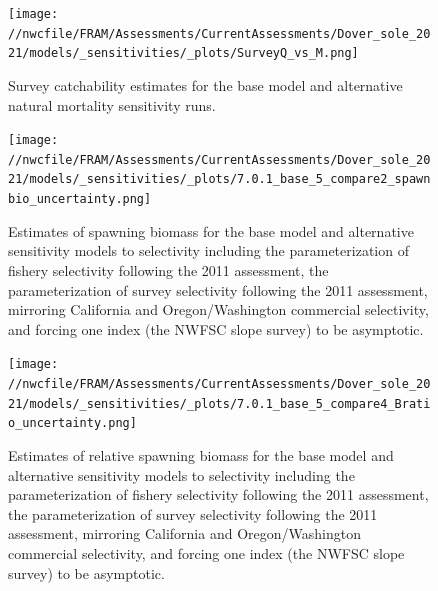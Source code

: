 \documentclass[11pt,
  english,
  a4paper,
]{article}
\begin{document}
\begin{figure}
\centering
\texttt{[image: //nwcfile/FRAM/Assessments/CurrentAssessments/Dover\_sole\_2021/models/\_sensitivities/\_plots/SurveyQ\_vs\_M.png]}
\caption{Survey catchability estimates for the base model and alternative natural mortality sensitivity runs.\label{fig:sens-m-survQ}}
\end{figure}

\tagmcend\tagstructend


\begin{figure}
\centering
\texttt{[image: //nwcfile/FRAM/Assessments/CurrentAssessments/Dover\_sole\_2021/models/\_sensitivities/\_plots/7.0.1\_base\_5\_compare2\_spawnbio\_uncertainty.png]}
\caption{Estimates of spawning biomass for the base model and alternative sensitivity models to selectivity including the parameterization of fishery selectivity following the 2011 assessment, the parameterization of survey selectivity following the 2011 assessment, mirroring California and Oregon/Washington commercial selectivity, and forcing one index (the NWFSC slope survey) to be asymptotic.\label{fig:sens-select-ssb}}
\end{figure}

\tagmcend\tagstructend


\begin{figure}
\centering
\texttt{[image: //nwcfile/FRAM/Assessments/CurrentAssessments/Dover\_sole\_2021/models/\_sensitivities/\_plots/7.0.1\_base\_5\_compare4\_Bratio\_uncertainty.png]}
\caption{Estimates of relative spawning biomass for the base model and alternative sensitivity models to selectivity including the parameterization of fishery selectivity following the 2011 assessment, the parameterization of survey selectivity following the 2011 assessment, mirroring California and Oregon/Washington commercial selectivity, and forcing one index (the NWFSC slope survey) to be asymptotic.\label{fig:sens-select-relssb}}
\end{figure}
\end{document}
